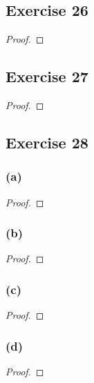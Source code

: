 \documentclass[14pt]{extarticle}
\begin{document}
\subsection{Exercise 26}

\begin{proof}

\end{proof}

\subsection{Exercise 27}

\begin{proof}

\end{proof}

\subsection{Exercise 28}

\subsubsection{(a)}

\begin{proof}

\end{proof}

\subsubsection{(b)}

\begin{proof}

\end{proof}

\subsubsection{(c)}

\begin{proof}

\end{proof}

\subsubsection{(d)}

\begin{proof}

\end{proof}
\end{document}

